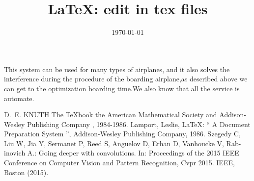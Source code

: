 \documentclass{article}
\title{\LaTeX: edit in tex files}
\date{\today}
\begin{document}
\maketitle

\newpage

This  system can be used for many types of airplanes\cite{1}, and it also solves the interference during  the procedure of the boarding airplane,as described above we can get to the  optimization boarding time\cite{sze:liu}.We also know that all the service is automate.\cite[page 22]{2}


\begin{thebibliography}{99}
 D.~E. KNUTH   The \TeX{}book  the American
Mathematical Society and Addison-Wesley
Publishing Company , 1984-1986.
Lamport, Leslie,  \LaTeX{}: `` A Document Preparation System '',
Addison-Wesley Publishing Company, 1986.
Szegedy C, Liu W, Jia Y, Sermanet P, Reed S, Anguelov D, Erhan D, Vanhoucke V, Rab-inovich A.:
Going deeper with convolutions. In:
Proceedings of the 2015 IEEE Conference on Computer Vision and Pattern Recognition,
Cvpr 2015. IEEE, Boston (2015).
\end{thebibliography}
\end{document}

